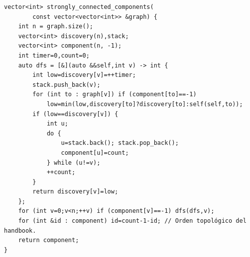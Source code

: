 \begin{lstlisting}[style=cpp]
vector<int> strongly_connected_components(
        const vector<vector<int>> &graph) {
    int n = graph.size();
    vector<int> discovery(n),stack;
    vector<int> component(n, -1);
    int timer=0,count=0;
    auto dfs = [&](auto &&self,int v) -> int {
        int low=discovery[v]=++timer;
        stack.push_back(v);
        for (int to : graph[v]) if (component[to]==-1)
            low=min(low,discovery[to]?discovery[to]:self(self,to));
        if (low==discovery[v]) {
            int u;
            do {
                u=stack.back(); stack.pop_back();
                component[u]=count;
            } while (u!=v);
            ++count;
        }
        return discovery[v]=low;
    };
    for (int v=0;v<n;++v) if (component[v]==-1) dfs(dfs,v);
    for (int &id : component) id=count-1-id; // Orden topológico del handbook.
    return component;
}
\end{lstlisting}

